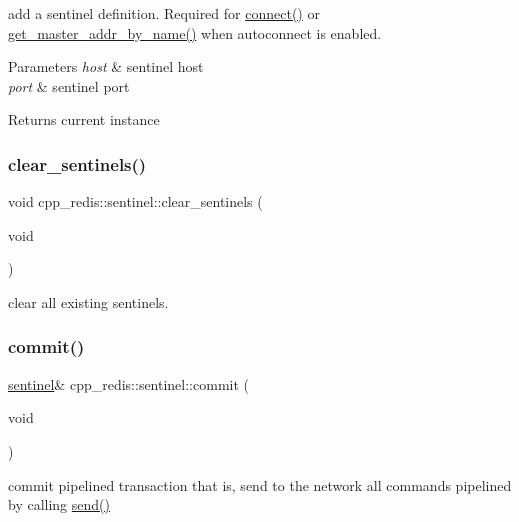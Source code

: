 add a sentinel definition. Required for \hyperlink{classcpp__redis_1_1sentinel_a1dfba8240daf7cfa7502f57957cffbda}{connect()} or \hyperlink{classcpp__redis_1_1sentinel_a2886493b40b00dfafdd3b22dfe28e0c3}{get\+\_\+master\+\_\+addr\+\_\+by\+\_\+name()} when autoconnect is enabled.


\begin{DoxyParams}{Parameters}
{\em host} & sentinel host \\
\hline
{\em port} & sentinel port \\
\hline
\end{DoxyParams}
\begin{DoxyReturn}{Returns}
current instance 
\end{DoxyReturn}
\mbox{\label{classcpp__redis_1_1sentinel_ac36640b3f392970c72f5a513a2d61ac7}} 
\subsubsection{\texorpdfstring{clear\+\_\+sentinels()}{clear\_sentinels()}}
{\footnotesize\ttfamily void cpp\+\_\+redis\+::sentinel\+::clear\+\_\+sentinels (\begin{DoxyParamCaption}\item[{void}]{ }\end{DoxyParamCaption})}

clear all existing sentinels. \mbox{\label{classcpp__redis_1_1sentinel_ad4f85d486499f82225b244f85091b31e}} 
\subsubsection{\texorpdfstring{commit()}{commit()}}
{\footnotesize\ttfamily \hyperlink{classcpp__redis_1_1sentinel}{sentinel}\& cpp\+\_\+redis\+::sentinel\+::commit (\begin{DoxyParamCaption}\item[{void}]{ }\end{DoxyParamCaption})}

commit pipelined transaction that is, send to the network all commands pipelined by calling \hyperlink{classcpp__redis_1_1sentinel_a0df522dbd7debda4e73f616a62d6f5ee}{send()}

